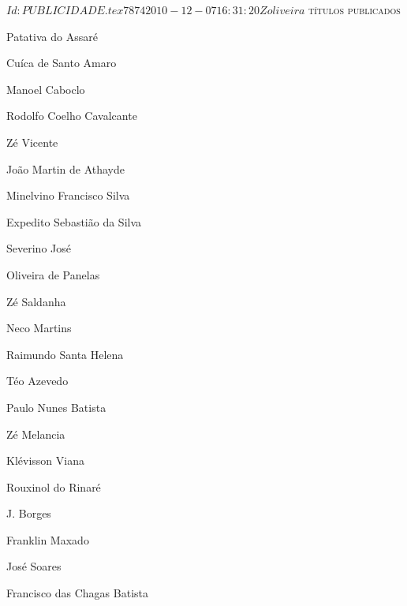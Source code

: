 \SVN $Id: PUBLICIDADE.tex 7874 2010-12-07 16:31:20Z oliveira $ 
\pagebreak
\pagestyle{empty}
\textsc{títulos publicados}
\begin{enumerate}
\setlength\itemsep{0.1mm}
{
\def\normalsize{\fontsize{7}{7}\selectfont}\normalsize
\item Patativa do Assaré
\item Cuíca de Santo Amaro
\item Manoel Caboclo
\item Rodolfo Coelho Cavalcante
\item Zé Vicente
\item João Martin de Athayde
\item Minelvino Francisco Silva
\item Expedito Sebastião da Silva
\item Severino José
\item Oliveira de Panelas
\item Zé Saldanha
\item Neco Martins
\item Raimundo Santa Helena
\item Téo Azevedo
\item Paulo Nunes Batista
\item Zé Melancia
\item Klévisson Viana
\item Rouxinol do Rinaré
\item J. Borges
\item Franklin Maxado
\item José Soares
\item Francisco das Chagas Batista
\vfill
}%
\end{enumerate}

